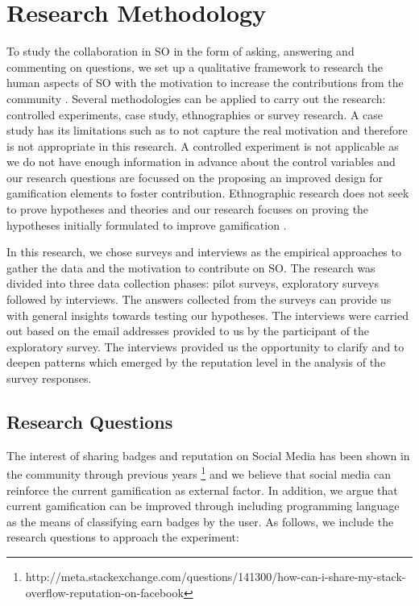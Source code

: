 \documentclass{sigchi}
\begin{document}
\section{Research Methodology}
To study the collaboration in SO in the form of asking, answering and commenting on questions, we set up a qualitative framework to research the human aspects of SO with the motivation to increase the contributions from the community \cite{Easterbrook}. Several methodologies can be applied to carry out the research: controlled experiments, case study, ethnographies or survey research. A case study has its limitations such as to not capture the real motivation and therefore is not appropriate in this research. A controlled experiment is not applicable as we do not have enough information in advance about the control variables and our research questions are focussed on the proposing an improved design for gamification elements to foster contribution. Ethnographic research does not seek to prove hypotheses and theories and our research focuses on proving the hypotheses initially formulated to improve gamification \cite{Easterbrook}.


In this research, we chose surveys and interviews as the empirical approaches to gather the data and the motivation to contribute on SO. The research was divided into three data collection phases: pilot surveys, exploratory surveys followed by interviews. The answers collected from the surveys can provide us with general insights towards testing our hypotheses. The interviews were carried out based on the email addresses provided to us by the participant of the exploratory survey. The interviews provided us the opportunity to clarify and to deepen patterns which emerged by the reputation level in the analysis of the survey responses.

\subsection{Research Questions}
The interest of sharing badges and reputation on Social Media has been shown in the community through previous years \footnote{http://meta.stackexchange.com/questions/141300/how-can-i-share-my-stack-overflow-reputation-on-facebook} and we believe that social media can reinforce the current gamification as external factor. In addition, we argue that current gamification can be improved through including programming language as the means of classifying earn badges by the user. As follows, we include the research questions to approach the experiment:
\end{document}
